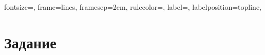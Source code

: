 
\isonefalse
\def \labnum {2}
\def \labsubj {Тестирование программного обеспечения}
\def \labauthor {Айтуганов Д. А. \\ Чебыкин И. Б.}
\def \labgroup {P3301}
\isinspfalse
\def \labinsp {}
\def \labname {Вариант: 633}
\isnametrue

\usepackage{graphicx}
\usepackage{verbatim}
\usepackage[dvipsnames]{xcolor}

\usepackage{fancyvrb}

 {
 fontsize=\scriptsize,
 frame=lines,  %
 framesep=2em, %
 rulecolor=\color{Gray},
 label=,
 labelposition=topline,
}



\section{Задание}


